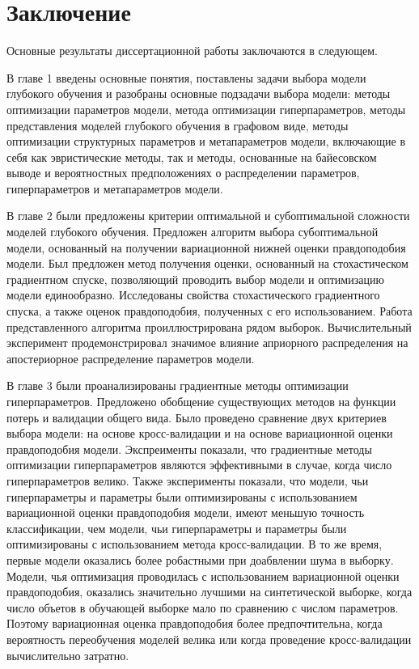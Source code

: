 
\chapter*{Заключение}
Основные результаты диссертационной работы заключаются в следующем.

В главе 1 введены основные понятия, поставлены задачи выбора модели глубокого обучения и разобраны основные подзадачи выбора модели: 
методы оптимизации параметров модели, метода оптимизации гиперпараметров, методы представления моделей глубокого обучения в графовом виде, методы оптимизации структурных параметров и метапараметров модели, включающие в себя как эвристические методы, так и методы, основанные на байесовском выводе и вероятностных предположениях о распределении параметров, гиперпараметров и метапараметров модели.

В главе 2 были предложены критерии оптимальной и субоптимальной сложности моделей глубокого обучения. Предложен алгоритм выбора субоптимальной модели, основанный на получении вариационной нижней оценки  правдоподобия модели. Был предложен метод получения оценки, основанный на стохастическом градиентном спуске, позволяющий проводить выбор модели и оптимизацию модели единообразно. Исследованы свойства стохастического градиентного спуска, а также оценок правдоподобия, полученных с его использованием. 
Работа представленного алгоритма проиллюстрирована рядом выборок. 
Вычислительный эксперимент продемонстрировал значимое влияние априорного распределения на апостериорное распределение параметров модели. 

В главе 3 были проанализированы градиентные методы оптимизации гиперпараметров. Предложено обобщение существующих методов на функции потерь и валидации общего вида.
Было проведено сравнение двух критериев выбора модели: на основе кросс-валидации и на основе вариационной оценки правдоподобия модели.
Экспреименты показали, что градиентные методы оптимизации гиперпараметров являются эффективными в случае, когда число гиперпараметров велико. Также эксперименты показали, что модели, чьи гиперпараметры и параметры были оптимизированы с использованием вариационной оценки правдоподобия модели, имеют меньшую точность классификации, чем модели, чьи гиперпараметры и параметры были оптимизированы с использованием метода кросс-валидации. В то же время, первые модели оказались более робастными при доабвлении шума в выборку. Модели, чья оптимизация проводилась с использованием вариационной оценки правдоподобия, оказались значительно лучшими на синтетической выборке, когда число объетов в обучающей выборке мало по сравнению с числом параметров. Поэтому вариационная оценка правдоподобия более предпочтительна, когда вероятность переобучения моделей велика или когда проведение кросс-валидации вычислительно затратно.

